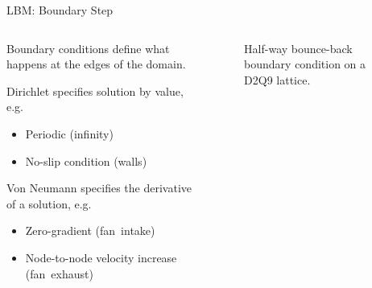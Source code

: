 \documentclass{beamer}
\begin{document}
\begin{frame}{LBM: Boundary Step}
\begin{columns}[T] %
\begin{column}{.7\textwidth}
Boundary conditions define what happens at the edges of the domain.

Dirichlet specifies solution by value, e.g.

\begin{itemize}
\item Periodic (infinity)
\item No-slip condition (walls)
\end{itemize}

Von Neumann specifies the derivative of a solution, e.g.

\begin{itemize}
\item Zero-gradient \mbox{(fan intake)}
\item Node-to-node velocity increase \mbox{(fan exhaust)}
\end{itemize}
\end{column}%
\hfill%
\begin{column}{0.3\textwidth}
\begin{figure}[t]
	\begin{tiny}
	\def\svgwidth{0.9\linewidth}
	
	\end{tiny}
	\caption{Half-way bounce-back boundary condition on a D2Q9 lattice.}
	\label{fig:bounce-back-hw}
\end{figure}
\end{column}%
\end{columns}
\end{frame}
\end{document}
